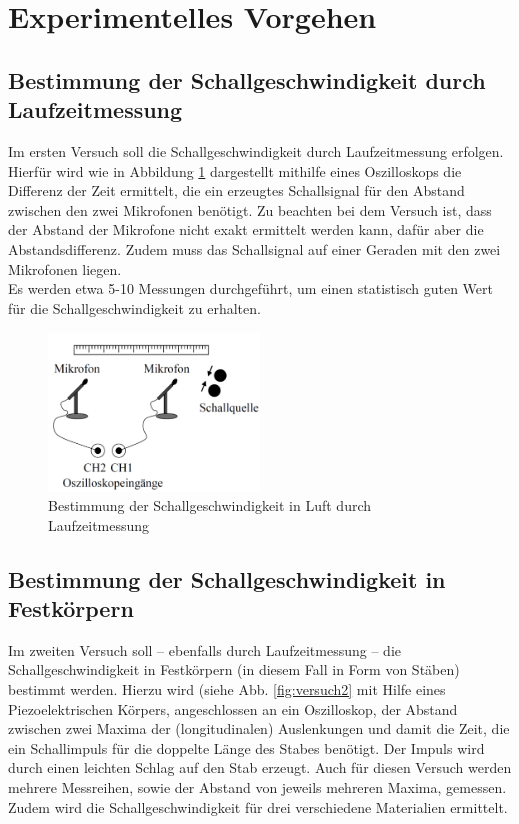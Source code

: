 \section{Experimentelles Vorgehen}
\subsection{Bestimmung der Schallgeschwindigkeit durch Laufzeitmessung}
Im ersten Versuch soll die Schallgeschwindigkeit durch Laufzeitmessung erfolgen. Hierfür wird wie in Abbildung \ref{fig:versuch1} dargestellt mithilfe eines Oszilloskops die Differenz der Zeit ermittelt, die ein erzeugtes Schallsignal für den Abstand zwischen den zwei Mikrofonen benötigt. Zu beachten bei dem Versuch ist, dass der Abstand der Mikrofone nicht exakt ermittelt werden kann, dafür aber die Abstandsdifferenz. Zudem muss das Schallsignal auf einer Geraden mit den zwei Mikrofonen liegen.\\
Es werden etwa 5-10 Messungen durchgeführt, um einen statistisch guten Wert für die Schallgeschwindigkeit zu erhalten.

\begin{figure}
\begin{center}
\includegraphics[width=0.5\textwidth]{Bilder/Versuchsaufbau1.png}
\caption{Bestimmung der Schallgeschwindigkeit in Luft durch Laufzeitmessung}
\label{fig:versuch1}
\end{center}
\end{figure}

\subsection{Bestimmung der Schallgeschwindigkeit in Festkörpern}
Im zweiten Versuch soll -- ebenfalls durch Laufzeitmessung -- die Schallgeschwindigkeit in Festkörpern (in diesem Fall in Form von Stäben) bestimmt werden. Hierzu wird (siehe Abb. \ref{fig:versuch2} mit Hilfe eines Piezoelektrischen Körpers, angeschlossen an ein Oszilloskop, der Abstand zwischen zwei Maxima der (longitudinalen) Auslenkungen und damit die Zeit, die ein Schallimpuls für die doppelte Länge des Stabes benötigt. Der Impuls wird durch einen leichten Schlag auf den Stab erzeugt. Auch für diesen Versuch werden mehrere Messreihen, sowie der Abstand von jeweils mehreren Maxima, gemessen.\\
Zudem wird die Schallgeschwindigkeit für drei verschiedene Materialien ermittelt.

